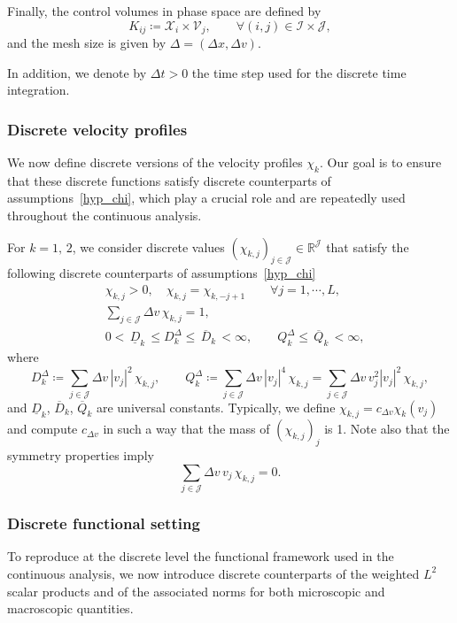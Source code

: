 \documentclass[reqno]{amsart}
\newcommand{\Dx}{\Delta x}
\newcommand{\Dv}{\Delta v}
\newcommand{\II}{\mathcal{I}}
\newcommand{\J}{\mathcal{J}}
\numberwithin{equation}{section}
\begin{document}
Finally, the control volumes in phase space are defined by
\[ K_{ij}\coloneq\mathcal{X}_i\times\mathcal{V}_j,\qquad \forall (i,j)\in\II\times \J,\]
and the mesh size is given by $\Delta=(\Dx,\Dv)$.

In addition, we denote by $\Delta t>0$ the time step used for the discrete time integration.

\subsubsection{Discrete velocity profiles} 
We now define discrete versions of the velocity profiles $\chi_k$. Our goal is to ensure that these discrete functions satisfy discrete counterparts of assumptions~\eqref{hyp_chi}, which play a crucial role and are repeatedly used throughout the continuous analysis. 

For $k=1,\,2$, we consider discrete values $(\chi_{k,j})_{j\in\J}\in\mathbb{R}^\J$ that satisfy the following discrete counterparts of assumptions~\eqref{hyp_chi}
\begin{equation}\label{hyp_chi_dis}
    \begin{aligned}
        & \chi_{k,j}>0,\quad \chi_{k,j}=\chi_{k,-j+1} \qquad \forall j=1,\cdots, L,\\
        & \sum_{j\in\J}\Dv\,\chi_{k,j}=1,\\
        & 0 <\,\underline{D}_k\,\leq D_k^\Delta\leq\,\overline{D}_k\,<\infty,\qquad Q_k^\Delta\leq\,\overline{Q}_k\,<\infty,
    \end{aligned}
\end{equation}
where 
\[ D_k^\Delta\coloneq\sum_{j\in\J}\Dv\,|v_j|^2\,\chi_{k,j},\qquad Q_k^\Delta\coloneq\sum_{j\in\J}\Dv\,|v_j|^4\,\chi_{k,j}=\sum_{j\in\J}\Dv\,v_j^2|v_j|^2\,\chi_{k,j},\]
and $\underline{D}_k$, $\overline{D}_k$, $\overline{Q}_k$ are universal constants. Typically, we define $\chi_{k,j}=c_{\Dv}\chi_k(v_j)$ and compute $c_{\Dv}$ in such a way that the mass of $(\chi_{k,j})_j$ is 1. Note also that the symmetry properties imply 
\begin{equation}\label{sym_chi_dis}
    \sum_{j\in\J}\Dv\,v_j\,\chi_{k,j}=0.
\end{equation}

\subsubsection{Discrete functional setting}
To reproduce at the discrete level the functional framework used in the continuous analysis, we now introduce discrete counterparts of the weighted $L^2$ scalar products and of the associated norms for both microscopic and macroscopic quantities.
\end{document}
